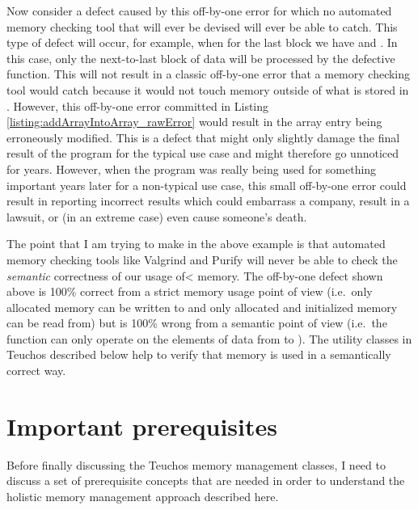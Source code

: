 \documentclass[pdf,ps2pdf,11pt]{SANDreport}
\begin{document}
Now consider a defect caused by this off-by-one error for which no
automated memory checking tool that will ever be devised will ever be
able to catch.  This type of defect will occur, for example, when for
the last block {} we have
{} and
{}.  In this case, only
the next-to-last block of data will be processed by the defective
{} function.  This will not result in a
classic off-by-one error that a memory checking tool would catch
because it would not touch memory outside of what is stored in
{}.  However, this off-by-one error committed in Listing
{}\ref{listing:addArrayIntoArray_rawError} would result in the array
entry {} being
erroneously modified.  This is a defect that might only slightly
damage the final result of the program for the typical use case and
might therefore go unnoticed for years.  However, when the program was
really being used for something important years later for a
non-typical use case, this small off-by-one error could result in
reporting incorrect results which could embarrass a company, result in
a lawsuit, or (in an extreme case) even cause someone's death.

The point that I am trying to make in the above example is that
automated memory checking tools like Valgrind and Purify will never be
able to check the {}\textit{semantic} correctness of our usage of<
memory.  The off-by-one defect shown above is 100\% correct from a
strict memory usage point of view (i.e.\ only allocated memory can be
written to and only allocated and initialized memory can be read from)
but is 100\% wrong from a semantic point of view (i.e.\ the function
{} can only operate on the elements of
data from {} to {}).  The utility classes in
Teuchos described below help to verify that memory is used in a
semantically correct way.


%
{}\section{Important prerequisites}
\label{sec:important-prerequisites}
%

Before finally discussing the Teuchos memory management classes, I
need to discuss a set of prerequisite concepts that are needed in
order to understand the holistic memory management approach described
here.
\end{document}
